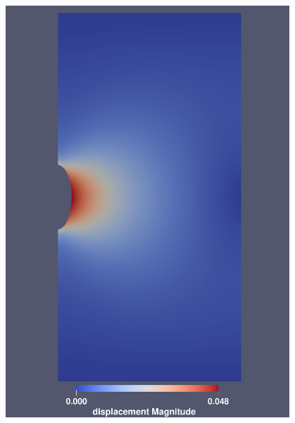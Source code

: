 \begin{figure}[ht!]
{\begin{minipage}{7cm}
            \includegraphics[width=0.95\textwidth]{img/chap4/90weiyi.pdf}
        \end{minipage}
    }
    \subfigure[150℃位移云图]
    {
        \begin{minipage}{7cm}
            \centering

\end{minipage}}
\end{figure}
